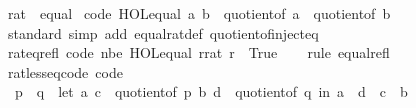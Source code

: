\begin{isabellebody}
\endisatagproof
{\isafoldproof}%
%
\isadelimproof
\isanewline
%
\endisadelimproof
\isanewline
{}\isamarkupfalse%
\ rat\ {\isacharcolon}{\kern0pt}{\isacharcolon}{\kern0pt}\ equal\isanewline
{}\isanewline
\isanewline
{}\isamarkupfalse%
\ {\isacharbrackleft}{\kern0pt}code{\isacharbrackright}{\kern0pt}{\isacharcolon}{\kern0pt}\ {\isachardoublequoteopen}HOL{\isachardot}{\kern0pt}equal\ a\ b\ {\isasymlongleftrightarrow}\ quotient{\isacharunderscore}{\kern0pt}of\ a\ {\isacharequal}{\kern0pt}\ quotient{\isacharunderscore}{\kern0pt}of\ b{\isachardoublequoteclose}\isanewline
\isanewline
{}\isamarkupfalse%
\isanewline
%
\isadelimproof
\ \ %
\endisadelimproof
%
\isatagproof
{}\isamarkupfalse%
\ standard\ {\isacharparenleft}{\kern0pt}simp\ add{\isacharcolon}{\kern0pt}\ equal{\isacharunderscore}{\kern0pt}rat{\isacharunderscore}{\kern0pt}def\ quotient{\isacharunderscore}{\kern0pt}of{\isacharunderscore}{\kern0pt}inject{\isacharunderscore}{\kern0pt}eq{\isacharparenright}{\kern0pt}%
\endisatagproof
{\isafoldproof}%
%
\isadelimproof
\isanewline
%
\endisadelimproof
\isanewline
{}\isamarkupfalse%
\ rat{\isacharunderscore}{\kern0pt}eq{\isacharunderscore}{\kern0pt}refl\ {\isacharbrackleft}{\kern0pt}code\ nbe{\isacharbrackright}{\kern0pt}{\isacharcolon}{\kern0pt}\ {\isachardoublequoteopen}HOL{\isachardot}{\kern0pt}equal\ {\isacharparenleft}{\kern0pt}r{\isacharcolon}{\kern0pt}{\isacharcolon}{\kern0pt}rat{\isacharparenright}{\kern0pt}\ r\ {\isasymlongleftrightarrow}\ True{\isachardoublequoteclose}\isanewline
%
\isadelimproof
\ \ %
\endisadelimproof
%
\isatagproof
{}\isamarkupfalse%
\ {\isacharparenleft}{\kern0pt}rule\ equal{\isacharunderscore}{\kern0pt}refl{\isacharparenright}{\kern0pt}%
\endisatagproof
{\isafoldproof}%
%
\isadelimproof
\isanewline
%
\endisadelimproof
\isanewline
{}\isamarkupfalse%
\isanewline
\isanewline
{}\isamarkupfalse%
\ rat{\isacharunderscore}{\kern0pt}less{\isacharunderscore}{\kern0pt}eq{\isacharunderscore}{\kern0pt}code\ {\isacharbrackleft}{\kern0pt}code{\isacharbrackright}{\kern0pt}{\isacharcolon}{\kern0pt}\isanewline
\ \ {\isachardoublequoteopen}p\ {\isasymle}\ q\ {\isasymlongleftrightarrow}\ {\isacharparenleft}{\kern0pt}let\ {\isacharparenleft}{\kern0pt}a{\isacharcomma}{\kern0pt}\ c{\isacharparenright}{\kern0pt}\ {\isacharequal}{\kern0pt}\ quotient{\isacharunderscore}{\kern0pt}of\ p{\isacharsemicolon}{\kern0pt}\ {\isacharparenleft}{\kern0pt}b{\isacharcomma}{\kern0pt}\ d{\isacharparenright}{\kern0pt}\ {\isacharequal}{\kern0pt}\ quotient{\isacharunderscore}{\kern0pt}of\ q\ in\ a\ {\isacharasterisk}{\kern0pt}\ d\ {\isasymle}\ c\ {\isacharasterisk}{\kern0pt}\ b{\isacharparenright}{\kern0pt}{\isachardoublequoteclose}\isanewline

\end{isabellebody}
